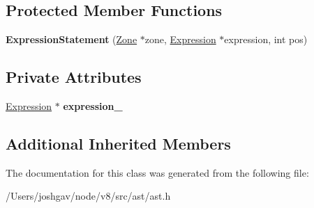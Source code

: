 \subsection*{Protected Member Functions}
\begin{DoxyCompactItemize}
\item 
{\bfseries Expression\+Statement} (\hyperlink{classv8_1_1internal_1_1_zone}{Zone} $\ast$zone, \hyperlink{classv8_1_1internal_1_1_expression}{Expression} $\ast$expression, int pos)\hypertarget{classv8_1_1internal_1_1_expression_statement_ac9476e3389059ec18c23e47736456b2b}{}\label{classv8_1_1internal_1_1_expression_statement_ac9476e3389059ec18c23e47736456b2b}

\end{DoxyCompactItemize}
\subsection*{Private Attributes}
\begin{DoxyCompactItemize}
\item 
\hyperlink{classv8_1_1internal_1_1_expression}{Expression} $\ast$ {\bfseries expression\+\_\+}\hypertarget{classv8_1_1internal_1_1_expression_statement_ac3b3fc46b6c9c2d784f12b392bd9d7a8}{}\label{classv8_1_1internal_1_1_expression_statement_ac3b3fc46b6c9c2d784f12b392bd9d7a8}

\end{DoxyCompactItemize}
\subsection*{Additional Inherited Members}


The documentation for this class was generated from the following file\+:\begin{DoxyCompactItemize}
\item 
/\+Users/joshgav/node/v8/src/ast/ast.\+h\end{DoxyCompactItemize}
